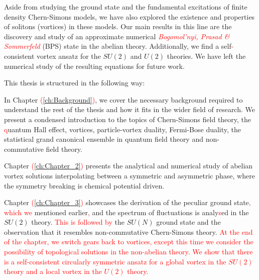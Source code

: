     Aside from studying the ground state and the fundamental excitations of finite density Chern-Simons models, we have also explored the existence and properties of solitons (vortices) in these models. Our main results in this line are the discovery and study of an approximate numerical \textcolor{red}{\textit{Bogomol'nyi, Prasad \& Sommerfeld}} (BPS) state in the abelian theory. Additionally, we find a self\textcolor{red}{-}consistent vortex ansatz for the $SU(2)$ and $U(2)$ theories. We have left the numerical study of the resulting equations for future work.

    This thesis is structured in the following way:

    In Chapter \textcolor{red}{(\ref{ch:Background})}, we cover the necessary background required to understand the rest of the thesis and how it fits in the wider field of research. We present a condensed introduction to the topics of Chern-Simons field theory, the \textcolor{red}{q}uantum Hall effect, vortices, particle-vortex duality, Fermi-Bose duality, the statistical grand canonical ensemble in quantum field theory and non-commutative field theory.

    Chapter \textcolor{red}{(\ref{ch:Chapter_2})} presents the analytical and numerical study of abelian vortex solutions interpolating between a symmetric and asymmetric phase, where the symmetry breaking is chemical potential driven.

    Chapter \textcolor{red}{(\ref{ch:Chapter_3})} showcases the derivation of the peculiar ground state\textcolor{red}{, which we} mentioned earlier\textcolor{red}{,} and the spectrum of fluctuations is analy\textcolor{red}{s}ed in the $SU(2)$ theory. \textcolor{red}{This is followed by} the $SU(N)$ ground state and the observation that it resembles non-commutative Chern-Simons theory. \textcolor{red}{At the end of the chapter, we switch gears back to vortices, except this time we consider the possibility of topological solutions in the non-abelian theory. We show that there is a self-consistent circularly symmetric ansatz for a global vortex in the $SU(2)$ theory and a local vortex in the $U(2)$ theory.}

    



